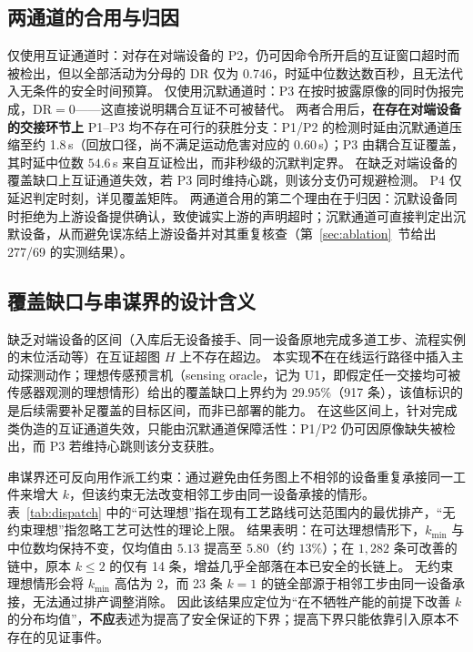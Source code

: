 \documentclass[manuscript,screen,review]{acmart}
\begin{document}
\subsection{两通道的合用与归因}
\label{sec:compose}

仅使用互证通道时：对存在对端设备的 P2，仍可因命令所开启的互证窗口超时而被检出，但以全部活动为分母的 DR 仅为 $0.746$，时延中位数达数百秒，且无法代入无条件的安全时间预算。
仅使用沉默通道时：P3 在按时披露原像的同时伪报完成，DR${=}0$——这直接说明耦合互证不可被替代。
两者合用后，\textbf{在存在对端设备的交接环节上} P1--P3 均不存在可行的获胜分支：P1/P2 的检测时延由沉默通道压缩至约 1.8\,s（回放口径，尚不满足运动危害对应的 $0.60$\,s）；P3 由耦合互证覆盖，其时延中位数 $54.6$\,s 来自互证检出，而非秒级的沉默判定界。
在缺乏对端设备的覆盖缺口上互证通道失效，若 P3 同时维持心跳，则该分支仍可规避检测。
P4 仅延迟判定时刻，详见覆盖矩阵。
两通道合用的第二个理由在于归因：沉默设备同时拒绝为上游设备提供确认，致使诚实上游的声明超时；沉默通道可直接判定出沉默设备，从而避免误冻结上游设备并对其重复核查（第~\ref{sec:ablation}~节给出 277/69 的实测结果）。

\subsection{覆盖缺口与串谋界的设计含义}
\label{sec:covdesign}

缺乏对端设备的区间（入库后无设备接手、同一设备原地完成多道工步、流程实例的末位活动等）在互证超图 $H$ 上不存在超边。
本实现\textbf{不}在在线运行路径中插入主动探测动作；理想传感预言机（sensing oracle，记为 U1，即假定任一交接均可被传感器观测的理想情形）给出的覆盖缺口上界约为 $29.95\%$（917 条），该值标识的是后续需要补足覆盖的目标区间，而非已部署的能力。
在这些区间上，针对完成类伪造的互证通道失效，只能由沉默通道保障活性：P1/P2 仍可因原像缺失被检出，而 P3 若维持心跳则该分支获胜。

串谋界还可反向用作派工约束：通过避免由任务图上不相邻的设备重复承接同一工件来增大 $k$，但该约束无法改变相邻工步由同一设备承接的情形。
表~\ref{tab:dispatch} 中的``可达理想''指在现有工艺路线可达范围内的最优排产，``无约束理想''指忽略工艺可达性的理论上限。
结果表明：在可达理想情形下，$k_{\min}$ 与中位数均保持不变，仅均值由 $5.13$ 提高至 $5.80$（约 $13\%$）；在 $1{,}282$ 条可改善的链中，原本 $k\le 2$ 的仅有 14 条，增益几乎全部落在本已安全的长链上。
无约束理想情形会将 $k_{\min}$ 高估为 2，而 23 条 $k{=}1$ 的链全部源于相邻工步由同一设备承接，无法通过排产调整消除。
因此该结果应定位为``在不牺牲产能的前提下改善 $k$ 的分布均值''，\textbf{不应}表述为提高了安全保证的下界；提高下界只能依靠引入原本不存在的见证事件。
\end{document}
